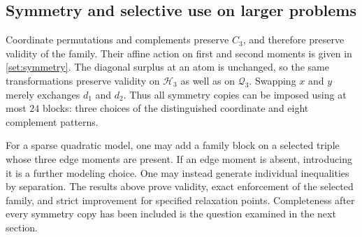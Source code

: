 \subsection{Symmetry and selective use on larger problems}
\label{family:symmetries}

Coordinate permutations and complements preserve $C_3$, and therefore
preserve validity of the family. Their affine action on first and
second moments is given in \cref{set:symmetry}.
The diagonal surplus at an atom is unchanged, so the same transformations
preserve validity on $\mathcal H_3$ as well as on $\mathcal Q_3$.
Swapping $x$ and $y$ merely exchanges $d_1$ and $d_2$. Thus all symmetry
copies can be imposed using at most $24$ blocks: three choices of the
distinguished coordinate and eight complement patterns.

For a sparse quadratic model, one may add a family block on a selected
triple whose three edge moments are present. If an edge moment is absent,
introducing it is a further modeling choice. One may instead generate
individual inequalities by separation. The results above prove validity,
exact enforcement of the selected family, and strict improvement for
specified relaxation points. Completeness after every symmetry copy has
been included is the question examined in the next section.
